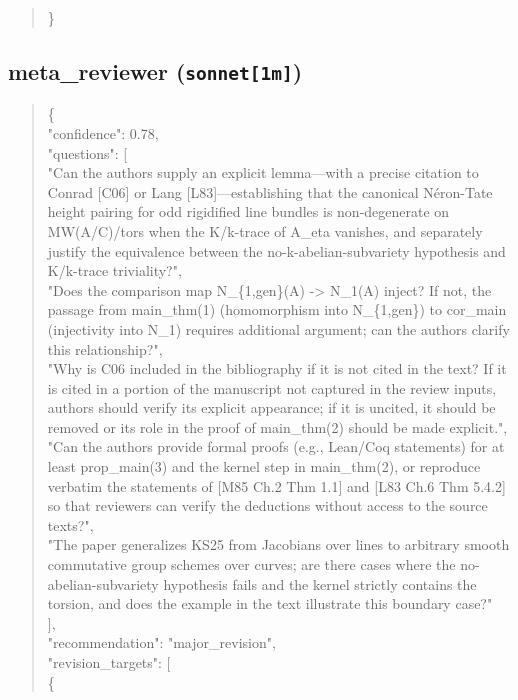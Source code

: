 \documentclass[11pt]{article}
\begin{document}
\begin{quote}
\}\\
\end{quote}

\subsection*{meta\_reviewer (\texttt{sonnet[1m]})}
\begin{quote}\small\ttfamily\raggedright
\{\\
  "confidence": 0.78,\\
  "questions": [\\
    "Can the authors supply an explicit lemma---with a precise citation to Conrad [C06] or Lang [L83]---establishing that the canonical Néron-Tate height pairing for odd rigidified line bundles is non-degenerate on MW(A/C)/tors when the K/k-trace of A\_eta vanishes, and separately justify the equivalence between the no-k-abelian-subvariety hypothesis and K/k-trace triviality?",\\
    "Does the comparison map N\_\{1,gen\}(A) -> N\_1(A) inject? If not, the passage from main\_thm(1) (homomorphism into N\_\{1,gen\}) to cor\_main (injectivity into N\_1) requires additional argument; can the authors clarify this relationship?",\\
    "Why is C06 included in the bibliography if it is not cited in the text? If it is cited in a portion of the manuscript not captured in the review inputs, authors should verify its explicit appearance; if it is uncited, it should be removed or its role in the proof of main\_thm(2) should be made explicit.",\\
    "Can the authors provide formal proofs (e.g., Lean/Coq statements) for at least prop\_main(3) and the kernel step in main\_thm(2), or reproduce verbatim the statements of [M85 Ch.2 Thm 1.1] and [L83 Ch.6 Thm 5.4.2] so that reviewers can verify the deductions without access to the source texts?",\\
    "The paper generalizes KS25 from Jacobians over lines to arbitrary smooth commutative group schemes over curves; are there cases where the no-abelian-subvariety hypothesis fails and the kernel strictly contains the torsion, and does the example in the text illustrate this boundary case?"\\
  ],\\
  "recommendation": "major\_revision",\\
  "revision\_targets": [\\
    \{\\

\end{quote}
\end{document}

